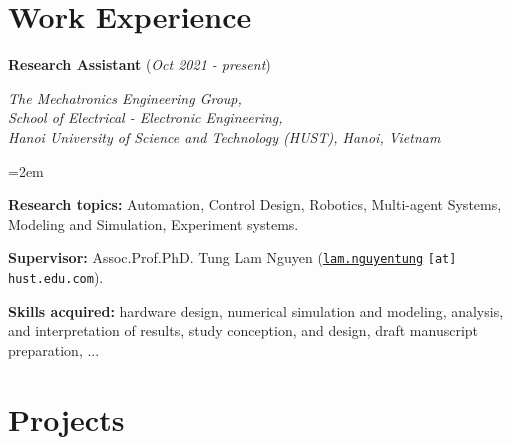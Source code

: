 \documentclass[10pt]{article}
\let\oldhref\href
\renewcommand{\href}[2]{\oldhref{#1}{\ul{#2}}}
\newcommand{\work}[4]{%
	\noindent \textbf{#1} (\textit{#2})\par
	\vspace{0.5em}
	\noindent \textit{#3}\par
	\vspace{0.5em}
	\noindent\hangindent=2em\hangafter=0 #4 \par\normalsize
}
\begin{document}
	
	
	\section*{Work Experience}
	
	\work{Research Assistant}{Oct 2021 - present}{The Mechatronics Engineering Group, \\School of Electrical - Electronic Engineering,\\Hanoi University of Science and Technology (HUST), Hanoi, Vietnam}{ \begin{soloitemize}
			\item \textbf{Research topics:} Automation, Control Design, Robotics, Multi-agent Systems, Modeling and Simulation, Experiment systems.
			\item \textbf{Supervisor:} Assoc.Prof.PhD. Tung Lam Nguyen
			({\href{mailto:lam.nguyentung@hust.edu.vn}{\texttt{lam.nguyentung}}}
			\texttt{[at] hust.edu.com}).
			\item \textbf{Skills acquired:}  hardware design, numerical simulation and modeling, analysis, and interpretation of results, study conception, and design, draft manuscript preparation, ...
		\end{soloitemize}
	}
	
	
	\section*{Projects}
	
\end{document}
